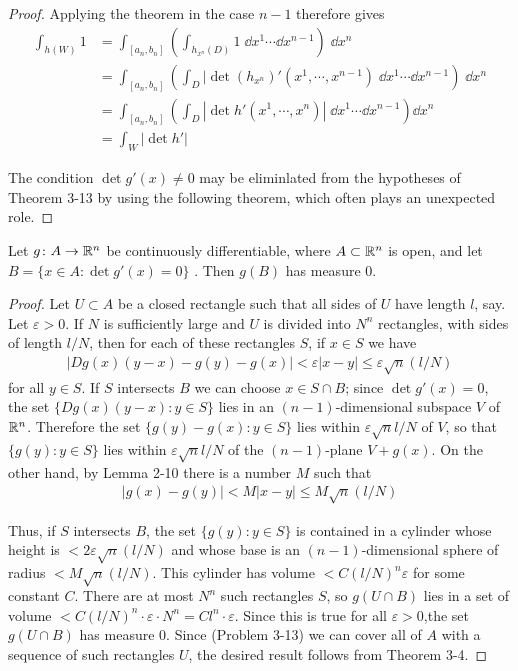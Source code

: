 \begin{proof}
Applying the theorem in the case $n-1$ therefore gives
\begin{align*}
    \int_{h(W)} 1 
    & = \int_{[a_n, b_n]} \left(\int_{h_{x^n}(D)} 1\;\dd x^1\cdots \dd x^{n-1}\right)\;\dd x^n \\
    & = \int_{[a_n, b_n]} \left(\int_{D} |\det (h_{x^n})'(x^1, \cdots, x^{n-1}) \;\dd x^1\cdots \dd x^{n-1}\right)\;\dd x^n \\
    & = \int_{[a_n, b_n]}^{}\left(\int_D |\det h'(x^1, \cdots, x^n)|\;\dd x^1\cdots \dd x^{n-1}\right)\dd x^n \\
    & = \int_W |\det h'|
\end{align*}

The condition $\det g'(x)\neq 0$ may be eliminlated from the hypotheses of Theorem 3-13 
by using the following theorem, which often plays an unexpected role.
\end{proof}

\begin{theorem}
    Let $g\colon{}A\to \mathbb{R}^n$ be continuously differentiable, where $A\subset \mathbb{R}^n$ is open, and 
    let $B=\{x\in A:\det g'(x)=0\}$ . Then $g(B)$ has measure 0.
    \label{test}
\end{theorem}

\begin{proof}
    Let $U\subset A$ be a closed rectangle such that all sides
of $U$ have length $l$, say. Let $\varepsilon > 0$. If $N$ is sufficiently large
and $U$ is divided into $N^n$ rectangles, with sides of length $l/N$,
then for each of these rectangles $S$, if $x\in S$ we have
\begin{align*}
    |Dg(x)(y-x) - g(y) - g(x)| 
    < \varepsilon |x-y|
    \le \varepsilon \sqrt{n}(l/N) 
\end{align*}
for all $y\in S$. If $S$ intersects $B$ we can choose $x\in S\cap B$;
since $\det g'(x)=0$, the set $\{Dg(x)(y-x):y\in S\}$ lies in an $(n-1)$-dimensional 
subspace $V$ of $\mathbb{R}^n$. Therefore the set $\{g(y)-g(x):y\in S\}$ lies within $\varepsilon\sqrt{n}l/N$
of $V$, so that $\{g(y):y\in S\}$ lies within $\varepsilon\sqrt{n}l/N$ of the $(n-1)$-plane 
$V+g(x)$. On the other hand, by Lemma 2-10 there is a number $M$ such that
\begin{align*}
  |g(x) - g(y)| < M|x-y| \le M\sqrt{n} (l/N)
\end{align*}

Thus, if $S$ intersects $B$, the set $\{g(y):y\in S\}$ is contained in a cylinder whose 
height is $<2\varepsilon \sqrt{n}(l/N)$ and whose base is an $(n-1)$-dimensional sphere
of radius $<M\sqrt{n}(l/N)$. This cylinder has volume $<C(l/N)^n\varepsilon$ for some constant $C$.
There are at most $N^n$ such rectangles $S$, so $g(U\cap B)$ lies in a set of volume $<C(l/N)^n\cdot 
\varepsilon \cdot N^n = Cl^n\cdot \varepsilon$. Since this is true for all $\varepsilon > 0$,the set 
$g(U\cap B)$ has measure 0. Since (Problem 3-13) we can cover all of $A$ with a sequence of such 
rectangles $U$, the desired result follows from Theorem 3-4. 
\end{proof}


